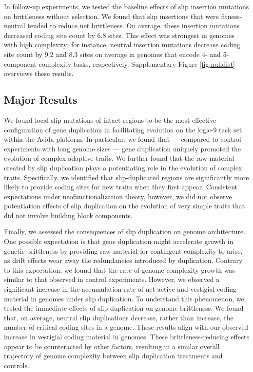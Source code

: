 In follow-up experiments, we tested the baseline effects of slip insertion mutations on brittleness without selection.
We found that slip insertions that were fitness-neutral tended to reduce net brittleness.
On average, these insertion mutations decreased coding site count by 6.8 sites.
This effect was strongest in genomes with high complexity; for instance, neutral insertion mutations decrease coding site count by 9.2 and 8.3 sites on average in genomes that encode 4- and 5-component complexity tasks, respectively.
Supplementary Figure \ref{fig:nulldist} overviews these results.



\subsection{Major Results}

We found local slip mutations of intact regions to be the most effective configuration of gene duplication in facilitating evolution on the logic-9 task set within the Avida platform.
In particular, we found that --- compared to control experiments with long genome sizes --- gene duplication uniquely promoted the evolution of complex adaptive traits.
We further found that the raw material created by slip duplication plays a potentiating role in the evolution of complex traits.
Specifically, we identified that slip-duplicated regions are significantly more likely to provide coding sites for new traits when they first appear.
Consistent expectations under neofunctionalization theory, however, we did not observe potentiation effects of slip duplication on the evolution of very simple traits that did not involve building block components.

Finally, we assessed the consequences of slip duplication on genome architecture.
One possible expectation is that gene duplication might accelerate growth in genetic brittleness by providing raw material for contingent complexity to arise, as drift effects wear away the redundancies introduced by duplication.
Contrary to this expectation, we found that the rate of genome complexity growth was similar to that observed in control experiments.
However, we observed a significant increase in the accumulation rate of net active and vestigial coding material in genomes under slip duplication.
To understand this phenomenon, we tested the immediate effects of slip duplication on genome brittleness.
We found that, on average, neutral slip duplications decrease, rather than increase, the number of critical coding sites in a genome.
These results align with our observed increase in vestigial coding material in genomes.
These brittleness-reducing effects appear to be counteracted by other factors, resulting in a similar overall trajectory of genome complexity between slip duplication treatments and controls.

